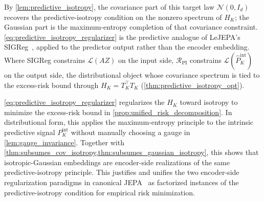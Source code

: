 By \cref{lem:predictive_isotropy}, the covariance part of this target law $\mathcal N(0,I_d)$ recovers the predictive-isotropy condition on the
nonzero spectrum of $H_K$; the Gaussian part is the maximum-entropy completion of that covariance constraint.
\eqref{eq:predictive_isotropy_regularizer} is the predictive analogue
of LeJEPA's SIGReg~\citep{balestriero2025lejepa}, applied to the
predictor output rather than the encoder embedding. 
Where SIGReg
constrains $\mathcal L(AZ)$ on the input side,
$\mathcal R_{\mathrm{PI}}$ constrains $\mathcal L(\widehat P_K^{\mathrm{int}})$ on the
output side, the distributional object whose covariance spectrum is tied
to the excess-risk bound through $H_K=T_K^\top T_K$ (\cref{thm:predictive_isotropy_opt}).


\eqref{eq:predictive_isotropy_regularizer} regularizes the $H_K$ toward isotropy to minimize the excess-risk bound in \cref{prop:unified_risk_decomposition}. 
In distributional form, this applies the maximum-entropy principle to the intrinsic predictive signal $P_K^{\mathrm{int}}$ without manually choosing a gauge in \cref{lem:gauge_invariance}.
Together with \cref{thm:subsumes_cov_isotropy,thm:subsumes_gaussian_isotropy}, this shows that isotropic-Gaussian embeddings are encoder-side realizations of the same predictive-isotropy principle.
This justifies and unifies the two encoder-side regularization paradigms in canonical JEPA~\citep{ermolov2021whitening,bardes2021vicreg,balestriero2025lejepa} as factorized instances of the predictive-isotropy condition for empirical risk minimization.




